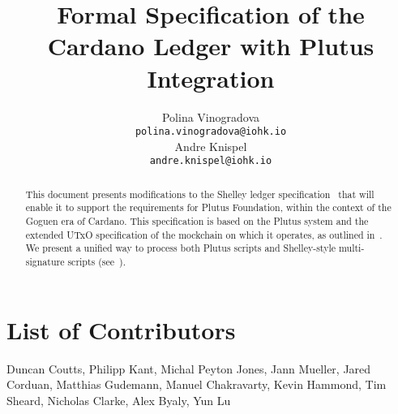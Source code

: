 

\cleardoublepage
\renewcommand{\thepage}{\arabic{page}}
\setcounter{page}{1}

\title{Formal Specification of the Cardano Ledger with Plutus
Integration}

\author{
   Polina Vinogradova \\ {\small \texttt{polina.vinogradova@iohk.io}} \\
   Andre Knispel \\ {\small \texttt{andre.knispel@iohk.io}} \\
   }

\date{}

\maketitle

\begin{abstract}
This document presents modifications to the Shelley ledger
specification~\cite{shelley_spec} that will enable it to support the requirements for Plutus Foundation, within the context of the Goguen era
of Cardano. This specification is based on the Plutus system and the extended
UTxO specification of the mockchain on which it operates, as outlined in~\cite{plutus_eutxo}.
%
We present a unified way to process both Plutus scripts and Shelley-style multi-signature scripts
(see~\cite{multi_sig}).
\end{abstract}

\section*{List of Contributors}
\label{acknowledgements}

Duncan Coutts,
Philipp Kant,
Michal Peyton Jones,
Jann Mueller,
Jared Corduan,
Matthias Gudemann,
Manuel Chakravarty,
Kevin Hammond,
Tim Sheard,
Nicholas Clarke,
Alex Byaly,
Yun Lu

